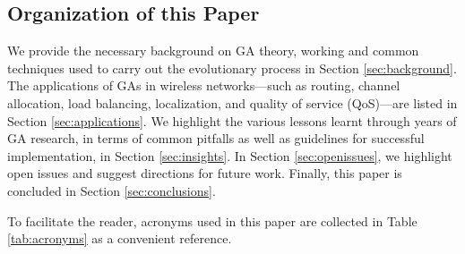 \documentclass[journal]{IEEEtran}
\begin{document}
\subsection{Organization of this Paper}

We provide the necessary background on GA theory, working and common techniques used to carry out the evolutionary process in Section \ref{sec:background}. The applications of GAs in wireless networks---such as routing, channel allocation, load balancing, localization, and quality of service (QoS)---are listed in  Section \ref{sec:applications}. We highlight the various lessons learnt through years of GA research, in terms of common pitfalls as well as guidelines for successful implementation, in Section \ref{sec:insights}. In Section \ref{sec:openissues}, we highlight open issues and suggest directions for future work. Finally, this paper is concluded in Section \ref{sec:conclusions}.

\vspace{3mm}
To facilitate the reader, acronyms used in this paper are collected in Table \ref{tab:acronyms} as a convenient reference.
\end{document}
